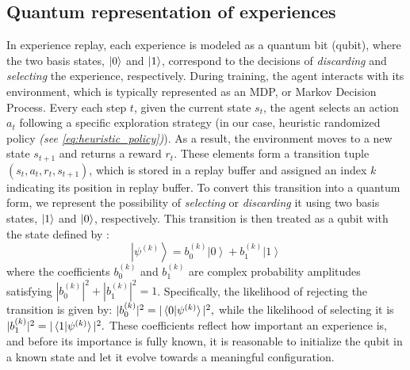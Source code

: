 \documentclass[journal]{IEEEtran}
\begin{document}
\subsection{Quantum representation of experiences}
In experience replay, each experience is modeled as a quantum bit (qubit), where the two basis states, $\ket{0}$ and $\ket{1}$, correspond to the decisions of \textit{discarding} and \textit{selecting} the experience, respectively.
During training, the agent interacts with its environment, which is typically represented as an MDP, or Markov Decision Process. Every each step $t$, given the current state $s_t$, the agent selects an action $a_t$ following a specific exploration strategy (in our case, heuristic randomized policy \textit{(see \ref{eq:heuristic_policy})}). As a result, the environment moves to a new state $s_{t+1}$ and returns a reward $r_t$. These elements form a transition tuple $(s_t, a_t, r_t, s_{t+1})$, which is stored in a replay buffer and assigned an index $k$ indicating its position in replay buffer.
To convert this transition into a quantum form, we represent the possibility of \textit{selecting} or \textit{discarding} it using two basis states, $\ket{1}$ and $\ket{0}$, respectively. This transition is then treated as a qubit with the state defined by \cite{9357477}:
\begin{equation}
\left |{\psi^{(k)}}\right \rangle = b_0^{(k)} \left |{0}\right \rangle + b_1^{(k)} \left |{1}\right \rangle
\label{buffer_qubit}
\end{equation}where the coefficients $b_0^{(k)}$ and $b_1^{(k)}$ are complex probability amplitudes satisfying \( |b_0^{(k)}|^2 + |b_1^{(k)}|^2 = 1\). Specifically, the likelihood of rejecting the transition is given by:
\( |b_0^{(k)}|^2 = |\braket{0 | \psi^{(k)}}|^2, \) while the likelihood of selecting it is \( |b_1^{(k)}|^2 = |\braket{1 | \psi^{(k)}}|^2.
\)
These coefficients reflect how important an experience is, and before its importance is fully known, it is reasonable to initialize the qubit in a known state and let it evolve towards a meaningful configuration. \\
\end{document}
